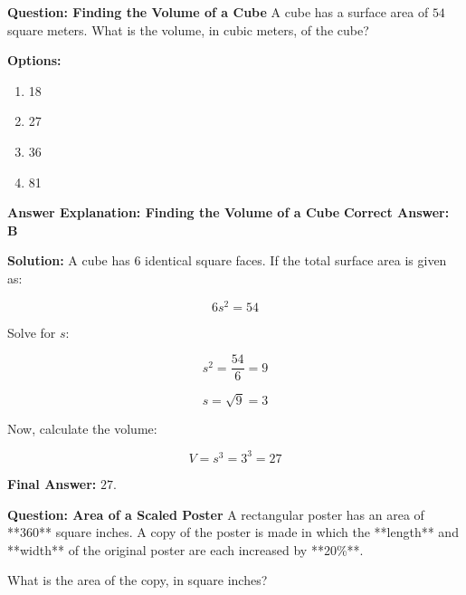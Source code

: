 \documentclass{beamer}
\begin{document}
\begin{frame}{\textbf{Question: Finding the Volume of a Cube}}
    A cube has a surface area of \( 54 \) square meters.  
    What is the volume, in cubic meters, of the cube?

    \vspace{0.5cm}
    \textbf{Options:}
    \begin{enumerate}
        \item[A.] 18
        \item[B.] 27
        \item[C.] 36
        \item[D.] 81
    \end{enumerate}
\end{frame}

\begin{frame}{\textbf{Answer Explanation: Finding the Volume of a Cube}}
    \textbf{Correct Answer: \textcolor{novelPurple}{\( \mathbf{B} \)}}  

    \vspace{0.3cm}
    \textbf{Solution:}  
    A cube has 6 identical square faces. If the total surface area is given as:

    \[
    6s^2 = 54
    \]

    Solve for \( s \):

    \[
    s^2 = \frac{54}{6} = 9
    \]

    \[
    s = \sqrt{9} = 3
    \]

    \vspace{0.3cm}
    Now, calculate the volume:

    \[
    V = s^3 = 3^3 = 27
    \]

    \textbf{Final Answer:} \( \boxed{27} \).
\end{frame}














\begin{frame}{\textbf{Question: Area of a Scaled Poster}}
    A rectangular poster has an area of **360** square inches.  
    A copy of the poster is made in which the **length** and **width**  
    of the original poster are each increased by **20\%**.  

    \vspace{0.5cm}
    What is the area of the copy, in square inches?
\end{frame}
\end{document}
